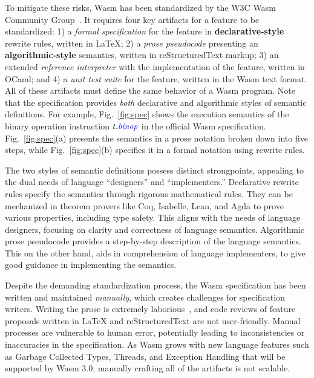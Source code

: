 To mitigate these risks, Wasm has been standardized by
the W3C Wasm Community Group~\cite{wasm-w3c}.
It requires four key artifacts for a feature to be standardized:
1) a \textit{formal specification} for the feature in \textbf{declarative-style} rewrite rules, written in LaTeX;
2) a \textit{prose pseudocode} presenting an \textbf{algorithmic-style} semantics, written in reStructuredText markup;
3) an extended \textit{reference interpreter} with the implementation of the feature, written in OCaml; and
4) a \textit{unit test suite} for the feature, written in the Wasm text format.
All of these artifacts must define the same behavior of a Wasm program.
Note that the specification provides \textit{both} declarative and algorithmic styles of semantic definitions.
For example, Fig.~\ref{fig:spec} shows the execution semantics of the binary operation instruction
$t.\mathit{{\color{blue}{binop}}}$ in the official Wasm specification.
Fig.~\ref{fig:spec}(a) presents the semantics in a prose notation broken down into five steps,
while Fig.~\ref{fig:spec}(b) specifies it in a formal notation using rewrite rules.

The two styles of semantic definitions possess distinct strongpoints,
appealing to the dual needs of language ``designers'' and ``implementers.''
Declarative rewrite rules specify the semantics through rigorous mathematical rules.
They can be mechanized in theorem provers like Coq, Isabelle, Lean, and Agda
to prove various properties, including type safety.
This aligns with the needs of language designers,
focusing on clarity and correctness of language semantics.
Algorithmic prose pseudocode provides a step-by-step description of the language semantics.
This on the other hand, aids in comprehension of language implementers,
to give good guidance in implementing the semantics.

Despite the demanding standardization process, the Wasm specification has been
written and maintained \textit{manually}, which creates challenges for specification writers.
Writing the prose is extremely laborious~\cite{Andreasicfp23}, and code reviews of
feature proposals written in LaTeX and reStructuredText are not user-friendly.
Manual processes are vulnerable to human error, potentially leading
to inconsistencies or inaccuracies in the specification.
As Wasm grows with new language features such as Garbage Collected Types, Threads,
and Exception Handling that will be supported by Wasm 3.0,
manually crafting all of the artifacts is not scalable.

